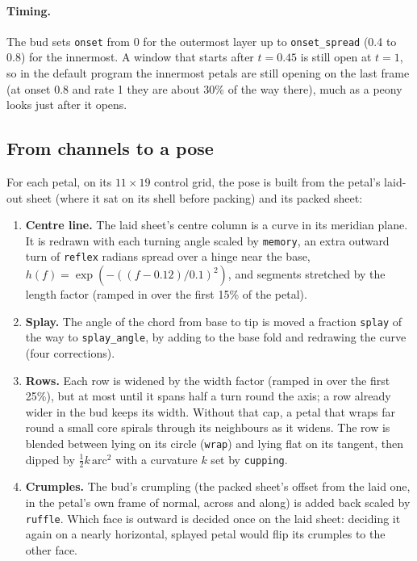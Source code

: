 \paragraph{Timing.} The bud sets \texttt{onset} from 0 for the outermost layer
up to \texttt{onset\_spread} (0.4 to 0.8) for the innermost. A window that
starts after $t = 0.45$ is still open at $t = 1$, so in the default program the
innermost petals are still opening on the last frame (at onset 0.8 and rate 1
they are about 30\% of the way there), much as a peony looks just after it
opens.

\subsection{From channels to a pose}\label{sec:opening-pose}
For each petal, on its $11\times19$ control grid, the pose is built from the
petal's laid-out sheet (where it sat on its shell before packing) and its
packed sheet:
\begin{enumerate}[leftmargin=*]
\item \textbf{Centre line.} The laid sheet's centre column is a curve in its
  meridian plane. It is redrawn with each turning angle scaled by
  \texttt{memory}, an extra outward turn of \texttt{reflex} radians spread over
  a hinge near the base, $h(f) = \exp(-((f-0.12)/0.1)^2)$, and segments
  stretched by the length factor (ramped in over the first 15\% of the petal).
\item \textbf{Splay.} The angle of the chord from base to tip is moved a
  fraction \texttt{splay} of the way to \texttt{splay\_angle}, by adding to the
  base fold and redrawing the curve (four corrections).
\item \textbf{Rows.} Each row is widened by the width factor (ramped in over
  the first 25\%), but at most until it spans half a turn round the axis; a row
  already wider in the bud keeps its width. Without that cap, a petal that
  wraps far round a small core spirals through its neighbours as it widens.
  The row is blended between lying on its circle (\texttt{wrap}) and lying
  flat on its tangent, then dipped by $\tfrac12 k\,\text{arc}^2$ with a
  curvature $k$ set by \texttt{cupping}.
\item \textbf{Crumples.} The bud's crumpling (the packed sheet's offset from
  the laid one, in the petal's own frame of normal, across and along) is added
  back scaled by \texttt{ruffle}. Which face is outward is decided once on the
  laid sheet: deciding it again on a nearly horizontal, splayed petal would
  flip its crumples to the other face.
\end{enumerate}

